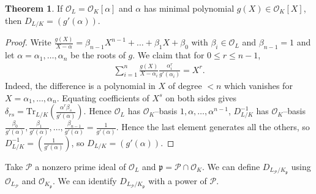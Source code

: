 \documentclass{article}
\theoremstyle{definition}
\newtheorem{theorem}{Theorem}[section]
\begin{document}
\begin{theorem}
    If $\mathcal{O}_{L} = \mathcal{O}_K[\alpha]$ and $\alpha$ has minimal polynomial $g(X) \in \mathcal{O}_K[X]$, then $D_{L/K} = (g'(\alpha))$.
\end{theorem}
\begin{proof}
    Write $\frac{g(X)}{X-\alpha}=\beta_{n-1}X^{n-1}+ \ldots + \beta_1 X + \beta_0$ with $\beta_i \in \mathcal{O}_L$ and $\beta_{n-1} = 1$ and let $\alpha=\alpha_1,\ldots,\alpha_n$ be the roots of $g$. We claim that for $0\le r\le n-1$, 
    \begin{align*}
        \sum_{i=1}^{n} \frac{g(X)}{X-\alpha_i}\frac{\alpha_i^r}{g'(\alpha_i)} = X^r.
    \end{align*}
    Indeed, the difference is a polynomial in $X$ of degree $<n$ which vanishes for $X=\alpha_1,\ldots,\alpha_n$. Equating coefficients of $X^s$ on both sides gives $\delta_{rs} = \text{Tr}_{L/K}\left(\frac{\alpha^r \beta_s}{g'(\alpha)}\right)$. Hence $\mathcal{O}_L$ has $\mathcal{O}_K$--basis $1,\alpha,\ldots,\alpha^{n-1}$, $D^{-1}_{L/K}$ has $\mathcal{O}_K$--basis $\frac{\beta_0}{g'(\alpha)}, \frac{\beta_1}{g'(\alpha)}, \ldots, \frac{\beta_{n-1}}{g'(\alpha)}=\frac{1}{g'(\alpha)}$. Hence the last element generates all the others, so $D_{L/K}^{-1} = \left(\frac{1}{g'(\alpha)}\right)$, so $D_{L/K} = (g'(\alpha))$.
\end{proof}

Take $\mathcal{P}$ a nonzero prime ideal of $\mathcal{O}_L$ and $\mathfrak{p} = \mathcal{P} \cap \mathcal{O}_K$. We can define $D_{L_\mathcal{P}/K_\mathfrak{p}}$ using $\mathcal{O}_{L_\mathcal{P}}$ and $\mathcal{O}_{K_{\mathfrak{p}}}$. We can identify $D_{L_\mathcal{P}/K_\mathfrak{p}}$ with a power of $\mathcal{P}$. 
\end{document}
